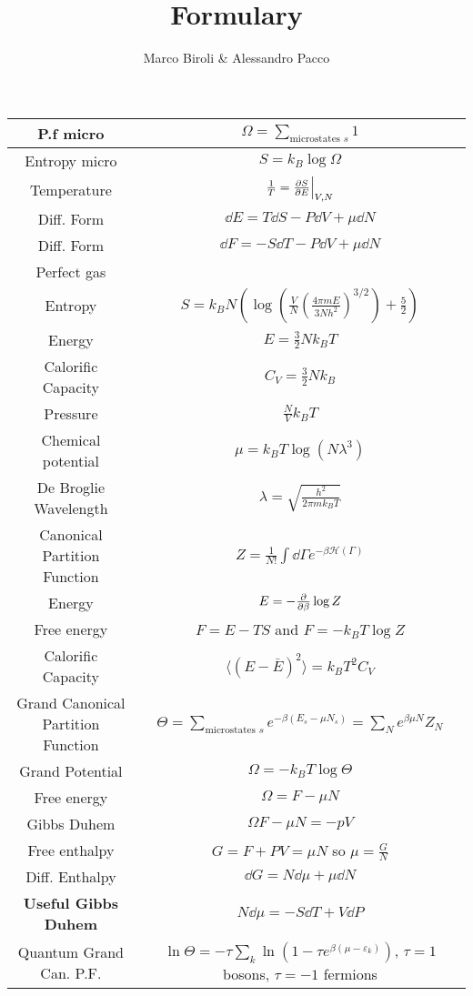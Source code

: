 \documentclass[10pt,a4paper]{article}
\author{Marco Biroli & Alessandro Pacco}
\title{Formulary}
\begin{document}
\begin{center}
\begin{tabular}{| c | c |}
\hline
P.f micro & $\Omega =  \sum_{\text{microstates } s} 1$\\
\hline
Entropy micro & $ S = k_B \log \Omega$\\
\hline
Temperature & $ \frac{1}{T} = \pdv{S}{E} \Big|_{V, N}$\\
\hline
Diff. Form & $\dd E = T \dd S - P \dd V + \mu \dd N$\\
\hline
Diff. Form & $\dd F = - S \dd T - P \dd V + \mu \dd N$\\
\hline
Perfect gas & \\
\hline
Entropy & $S = k_B N \left( \log(\frac{V}{N} \left(\frac{4 \pi m E}{3 N h^2}\right)^{3/2}) + \frac{5}{2}\right)$\\
\hline
Energy & $E = \frac{3}{2}N k_B T$\\
\hline
Calorific Capacity & $C_V = \frac{3}{2}N k_B$ \\
\hline
Pressure & $\frac{N}{V}k_B T$\\
\hline
Chemical potential & $\mu = k_B T \log(N \lambda^3)$\\
\hline
De Broglie Wavelength & $\lambda = \sqrt{\frac{h^2}{2 \pi m k_B T}}$\\
\hline 
Canonical Partition Function & $ Z = \frac{1}{N!} \int \dd \Gamma e^{-\beta \mathcal{H}(\Gamma)}$\\
\hline
Energy & $E = -\pdv{}{\beta}\log Z$\\
\hline
Free energy & $F = E - TS$ and $F = - k_B T \log Z$\\
\hline
Calorific Capacity & $\langle (E - \bar{E})^2 \rangle = k_B T^2 C_V$\\
\hline
Grand Canonical Partition Function & $\Theta = \sum_{\text{microstates } s} e^{-\beta(E_s - \mu N_s)} = \sum_N e^{\beta \mu N} Z_N$\\
\hline 
Grand Potential & $\Omega = -k_B T \log \Theta$\\
\hline
Free energy & $\Omega = F - \mu N$\\
\hline
Gibbs Duhem & $\Omega F - \mu N = - p V$\\
\hline
Free enthalpy & $ G = F + PV = \mu N$ so $\mu = \frac{G}{N}$\\
\hline
Diff. Enthalpy & $ \dd G = N \dd \mu + \mu \dd N$\\
\hline
\textbf{Useful Gibbs Duhem} & $N\dd\mu = - S \dd T + V \dd P$\\
\hline
Quantum Grand Can. P.F. & $\ln \Theta = - \tau \sum_k \ln(1 - \tau e^{\beta(\mu - \varepsilon_k)})$, $\tau = 1$ bosons, $\tau = -1$ fermions\\
\hline
\end{tabular}
\end{center}
\end{document}
